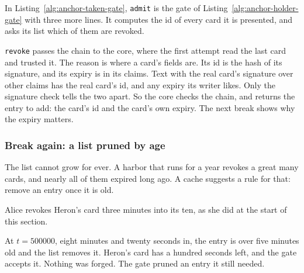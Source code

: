 In Listing~\ref{alg:anchor-taken-gate}, \texttt{admit} is the gate of
Listing~\ref{alg:anchor-holder-gate} with three more lines. It computes the
id of every card it is presented, and asks its list which of them are
revoked.


\texttt{revoke} passes the chain to the core, where the first attempt read
the last card and trusted it. The reason is where a card's fields are. Its
id is the hash of its
signature, and its expiry is in its claims. Text with the real
card's signature over other claims has the real card's id, and any expiry
its writer likes. Only the signature check tells the two apart. So the
core checks the chain, and returns the entry to add: the card's
id and the card's own expiry. The next break shows why the expiry matters.

\pagebreak[0]

\subsubsection{Break again: a list pruned by age}

The list cannot grow for ever. A harbor that runs for a year revokes
a great many cards, and nearly all of them expired long ago. A cache
suggests a rule for that: remove an entry once it is old.


Alice revokes Heron's card three minutes into its ten, as she did at
the start of this section.


At $t=500000$, eight minutes and twenty seconds in, the entry is over
five minutes old and the list removes it. Heron's card has a hundred
seconds left, and the gate accepts it. Nothing was forged. The gate pruned
an entry it still needed.


